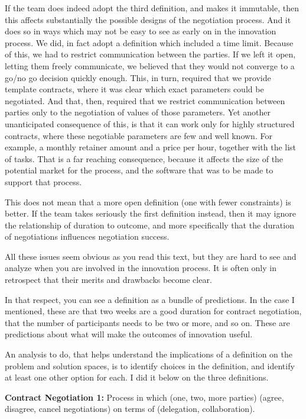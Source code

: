 \documentclass[graybox,envcountchap,sectrefs]{svmono}
\begin{document}
If the team does indeed adopt the third definition, and makes it immutable, then this affects substantially the possible designs of the negotiation process. And it does so in ways which may not be easy to see as early on in the innovation process. We did, in fact adopt a definition which included a time limit. Because of this, we had to restrict communication between the parties. If we left it open, letting them freely communicate, we believed that they would not converge to a go/no go decision quickly enough. This, in turn, required that we provide template contracts, where it was clear which exact parameters could be negotiated. And that, then, required that we restrict communication between parties only to the negotiation of values of those parameters. Yet another unanticipated consequence of this, is that it can work only for highly structured contracts, where these negotiable parameters are few and well known. For example, a monthly retainer amount and a price per hour, together with the list of tasks. That is a far reaching consequence, because it affects the size of the potential market for the process, and the software that was to be made to support that process.

This does not mean that a more open definition (one with fewer constraints) is better. If the team takes seriously the first definition instead, then it may ignore the relationship of duration to outcome, and more specifically that the duration of negotiations influences negotiation success.

All these issues seem obvious as you read this text, but they are hard to see and analyze when you are involved in the innovation process. It is often only in retrospect that their merits and drawbacks become clear.

In that respect, you can see a definition as a bundle of predictions. In the case I mentioned, these are that two weeks are a good duration for contract negotiation, that the number of participants needs to be two or more, and so on. These are predictions about what will make the outcomes of innovation useful.

An analysis to do, that helps understand the implications of a definition on the problem and solution spaces, is to identify choices in the definition, and identify at least one other option for each. I did it below on the three definitions.

\begin{svgraybox}
\textbf{Contract Negotiation 1:} Process in which (one, two, more parties) (agree, disagree, cancel negotiations) on terms of (delegation, collaboration).
\end{svgraybox}
\end{document}
